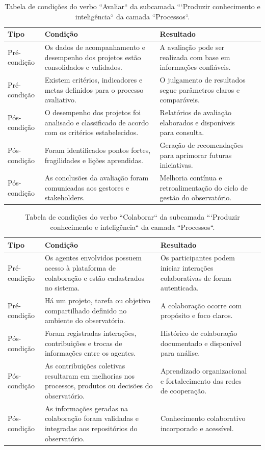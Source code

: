 \begin{apendicesenv}
\begin{table}[H]
\centering
\caption{Tabela de condições do verbo ``Avaliar`` da subcamada ```Produzir conhecimento e inteligência`` da camada ``Processos``.}
\begin{tabularx}{\textwidth}{|l|X|X|X|}
\hline
\textbf{Tipo} & \textbf{Condição} & \textbf{Resultado} \\ \hline
Pré-condição & Os dados de acompanhamento e desempenho dos projetos estão consolidados e validados. & A avaliação pode ser realizada com base em informações confiáveis.\\ \hline
Pré-condição & Existem critérios, indicadores e metas definidos para o processo avaliativo. & O julgamento de resultados segue parâmetros claros e comparáveis. \\ \hline
Pós-condição & O desempenho dos projetos foi analisado e classificado de acordo com os critérios estabelecidos. & Relatórios de avaliação elaborados e disponíveis para consulta.\\ \hline
Pós-condição & Foram identificados pontos fortes, fragilidades e lições aprendidas. & Geração de recomendações para aprimorar futuras iniciativas. \\ \hline
Pós-condição & As conclusões da avaliação foram comunicadas aos gestores e stakeholders. & Melhoria contínua e retroalimentação do ciclo de gestão do observatório.\\ \hline
\end{tabularx}
\end{table}

\begin{table}[H]
\centering
\caption{Tabela de condições do verbo ``Colaborar`` da subcamada ```Produzir conhecimento e inteligência`` da camada ``Processos``.}
\begin{tabularx}{\textwidth}{|l|X|X|X|}
\hline
\textbf{Tipo} & \textbf{Condição} & \textbf{Resultado} \\ \hline
Pré-condição & Os agentes envolvidos possuem acesso à plataforma de colaboração e estão cadastrados no sistema. & Os participantes podem iniciar interações colaborativas de forma autenticada.\\ \hline
Pré-condição & Há um projeto, tarefa ou objetivo compartilhado definido no ambiente do observatório. & A colaboração ocorre com propósito e foco claros.\\ \hline
Pós-condição & Foram registradas interações, contribuições e trocas de informações entre os agentes. & Histórico de colaboração documentado e disponível para análise.\\ \hline
Pós-condição & As contribuições coletivas resultaram em melhorias nos processos, produtos ou decisões do observatório. & Aprendizado organizacional e fortalecimento das redes de cooperação.\\ \hline
Pós-condição & As informações geradas na colaboração foram validadas e integradas aos repositórios do observatório. & Conhecimento colaborativo incorporado e acessível.\\ \hline
\end{tabularx}
\end{table}


\end{apendicesenv}
